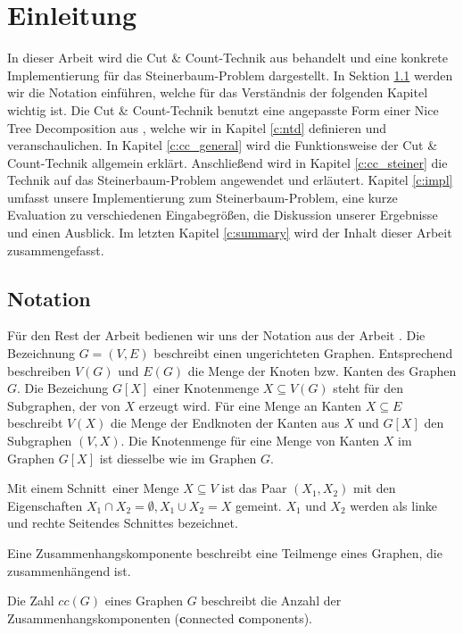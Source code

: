 \chapter{Einleitung}
\label{c:intro} %
In dieser Arbeit wird die Cut \& Count-Technik aus \cite{cygan_solving_2011} behandelt und eine konkrete Implementierung für das Steinerbaum-Problem dargestellt. 
In Sektion \ref{sec:intro_not} werden wir die Notation einführen, welche für das Verständnis der folgenden Kapitel wichtig ist. 
Die Cut \& Count-Technik benutzt eine angepasste Form einer Nice Tree Decomposition aus \cite{kloks1994}, welche wir in Kapitel \ref{c:ntd} definieren und veranschaulichen.
In Kapitel \ref{c:cc_general} wird die Funktionsweise der Cut \& Count-Technik allgemein erklärt. 
Anschließend wird in Kapitel \ref{c:cc_steiner} die Technik auf das Steinerbaum-Problem angewendet und erläutert. 
Kapitel \ref{c:impl} umfasst unsere Implementierung zum Steinerbaum-Problem, eine kurze Evaluation zu verschiedenen Eingabegrößen, die Diskussion unserer Ergebnisse und einen Ausblick. 
Im letzten Kapitel \ref{c:summary} wird der Inhalt dieser Arbeit zusammengefasst.

\section{Notation}
\label{sec:intro_not}
Für den Rest der Arbeit bedienen wir uns der Notation aus der Arbeit \cite{cygan_solving_2011}. 
Die Bezeichnung $G=(V,E)$ beschreibt einen ungerichteten Graphen. Entsprechend beschreiben $V(G)$ und $E(G)$ die Menge der Knoten bzw. Kanten des Graphen $G$. 
Die Bezeichung $G[X]$ einer Knotenmenge $X \subseteq V(G)$ steht für den Subgraphen, der von $X$ erzeugt wird. Für eine Menge an Kanten $X \subseteq E$ beschreibt $V(X)$ die Menge der Endknoten der Kanten aus $X$ und $G[X]$ den Subgraphen $(V,X)$. 
Die Knotenmenge für eine Menge von Kanten $X$ im Graphen $G[X]$ ist diesselbe wie im Graphen $G$.

Mit einem \glqq Schnitt\grqq ~einer Menge $X \subseteq V$ ist das Paar $(X_1,X_2)$ mit den Eigenschaften $X_1 \cap X_2 = \emptyset,X_1 \cup X_2 = X$ gemeint. 
$X_1$ und $X_2$ werden als linke und rechte \glqq Seiten\grqq des Schnittes bezeichnet. 

Eine Zusammenhangskomponente beschreibt eine Teilmenge eines Graphen, die zusammenhängend ist.

Die Zahl $cc(G)$ eines Graphen $G$ beschreibt die Anzahl der Zusammenhangskomponenten (\glqq \textbf{c}onnected \textbf{c}omponents\grqq).

